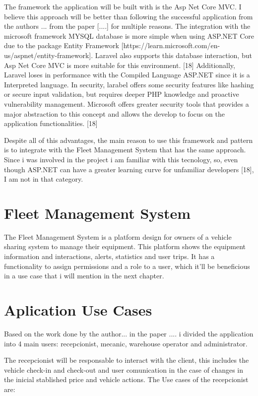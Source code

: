 The framework the application will be built with is the Asp Net Core MVC. 
I believe this approach will be better than following the successful application from the authors ... from the paper [....] for multiple reasons.
The integration with the microsoft framework MYSQL database is more simple when using ASP.NET Core due to the package Entity Framework [https://learn.microsoft.com/en-us/aspnet/entity-framework]. 
Laravel also supports this database interaction, but Asp Net Core MVC is more suitable for this environment. [18]
Additionally, Laravel loses in performance with the Compiled Language ASP.NET since it is a Interpreted language. 
In security, larabel offers some security features like hashing or secure input validation, but requires deeper PHP knowledge and proactive vulnerability management. 
Microsoft offers greater security tools that provides a major abstraction to this concept and allows the develop to focus on the application functionalities. [18]

Despite all of this advantages, the main reason to use this framework and pattern is to integrate with the Fleet Management System that has the same approach. 
Since i was involved in the project i am familiar with this tecnology, so, even though ASP.NET can have a greater learning curve for unfamiliar developers [18], I am not in that category.


\section{Fleet Management System}
The Fleet Management System is a platform design for owners of a vehicle sharing system to manage their equipment. 
This platform shows the equipment information and interactions, alerts, statistics and user trips. 
It has a functionality to assign permissions and a role to a user, which it'll be beneficious in a use case that i will mention in the next chapter.   

\section{Aplication Use Cases}
Based on the work done by the author... in the paper .... i divided the application into 4 main users: recepcionist, mecanic, warehouse operator and administrator.

The recepcionist will be responsable to interact with the client, this includes the vehicle check-in and check-out and user comunication in the case of changes in the inicial stablished price and vehicle actions. 
The Use cases of the recepcionist are:

